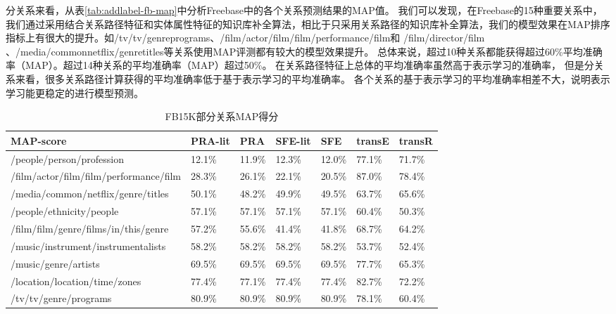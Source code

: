分关系来看，从表\ref{tab:addlabel-fb-map}中分析Freebase中的各个关系预测结果的MAP值。
我们可以发现，在Freebase的15种重要关系中，
我们通过采用结合关系路径特征和实体属性特征的知识库补全算法，相比于只采用关系路径的知识库补全算法，我们的模型效果在MAP排序指标上有很大的提升。如/tv/tv/genreprograms、/film/actor/film/film/performance/film和 /film/director/film 、/media/commonnetflix/genretitles等关系使用MAP评测都有较大的模型效果提升。
总体来说，超过10种关系都能获得超过60\%平均准确率（MAP）。超过14种关系的平均准确率（MAP）超过50\%。
在关系路径特征上总体的平均准确率虽然高于表示学习的准确率，
但是分关系来看，很多关系路径计算获得的平均准确率低于基于表示学习的平均准确率。
各个关系的基于表示学习的平均准确率相差不大，说明表示学习能更稳定的进行模型预测。

\begin{table}[htbp]
  \centering
  \caption{FB15K部分关系MAP得分}
    \begin{tabular}{|p{5.8cm}|p{1.4cm}|p{1.4cm}|p{1.4cm}|p{1.4cm}|p{1.4cm}|p{1.4cm}|} %
    \hline
    MAP-score & \multicolumn{1}{l|}{PRA-lit  } & \multicolumn{1}{l|}{PRA} & \multicolumn{1}{l|}{SFE-lit} & \multicolumn{1}{l|}{SFE} & \multicolumn{1}{l|}{transE} & \multicolumn{1}{l|}{transR} \\
    \hline
    /people/person/profession & 12.1\% & 11.9\% & 12.3\% & 12.0\% & 77.1\% & 71.7\% \\
    \hline
    /film/actor/film/film/performance/film & 28.3\% & 26.1\% & 22.1\% & 20.5\% & 87.0\% & 78.4\% \\
    \hline
    /media/common/netflix/genre/titles & 50.1\% & 48.2\% & 49.9\% & 49.5\% & 63.7\% & 65.6\% \\
    \hline
    /people/ethnicity/people & 57.1\% & 57.1\% & 57.1\% & 57.1\% & 60.4\% & 50.3\% \\
    \hline
    /film/film/genre/films/in/this/genre & 57.2\% & 55.6\% & 41.4\% & 41.8\% & 68.7\% & 64.2\% \\
    \hline
    /music/instrument/instrumentalists & 58.2\% & 58.2\% & 58.2\% & 58.2\% & 53.7\% & 52.4\% \\
    \hline
    /music/genre/artists & 69.5\% & 69.5\% & 69.5\% & 69.5\% & 77.7\% & 65.3\% \\
    \hline
    /location/location/time/zones & 77.4\% & 77.1\% & 77.4\% & 77.4\% & 82.7\% & 72.2\% \\
    \hline
    /tv/tv/genre/programs & 80.9\% & 80.9\% & 80.9\% & 80.9\% & 78.1\% & 60.4\% \\

\end{tabular}
\end{table}
